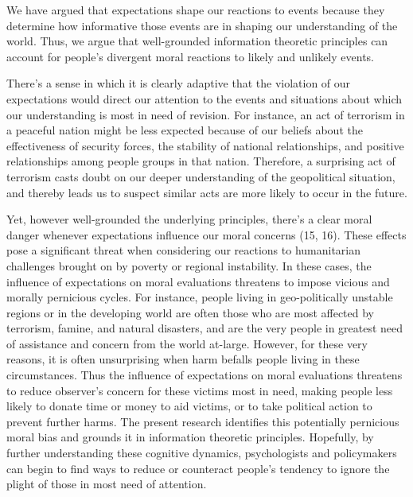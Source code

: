 \documentclass[9pt,twocolumn,twoside,]{pnas-new}
\begin{document}
We have argued that expectations shape our reactions to events because
they determine how informative those events are in shaping our
understanding of the world. Thus, we argue that well-grounded
information theoretic principles can account for people's divergent
moral reactions to likely and unlikely events.

There's a sense in which it is clearly adaptive that the violation of
our expectations would direct our attention to the events and situations
about which our understanding is most in need of revision. For instance,
an act of terrorism in a peaceful nation might be less expected because
of our beliefs about the effectiveness of security forces, the stability
of national relationships, and positive relationships among people
groups in that nation. Therefore, a surprising act of terrorism casts
doubt on our deeper understanding of the geopolitical situation, and
thereby leads us to suspect similar acts are more likely to occur in the
future.

Yet, however well-grounded the underlying principles, there's a clear
moral danger whenever expectations influence our moral concerns (15,
16). These effects pose a significant threat when considering our
reactions to humanitarian challenges brought on by poverty or regional
instability. In these cases, the influence of expectations on moral
evaluations threatens to impose vicious and morally pernicious cycles.
For instance, people living in geo-politically unstable regions or in
the developing world are often those who are most affected by terrorism,
famine, and natural disasters, and are the very people in greatest need
of assistance and concern from the world at-large. However, for these
very reasons, it is often unsurprising when harm befalls people living
in these circumstances. Thus the influence of expectations on moral
evaluations threatens to reduce observer's concern for these victims
most in need, making people less likely to donate time or money to aid
victims, or to take political action to prevent further harms. The
present research identifies this potentially pernicious moral bias and
grounds it in information theoretic principles. Hopefully, by further
understanding these cognitive dynamics, psychologists and policymakers
can begin to find ways to reduce or counteract people's tendency to
ignore the plight of those in most need of attention.
\end{document}
